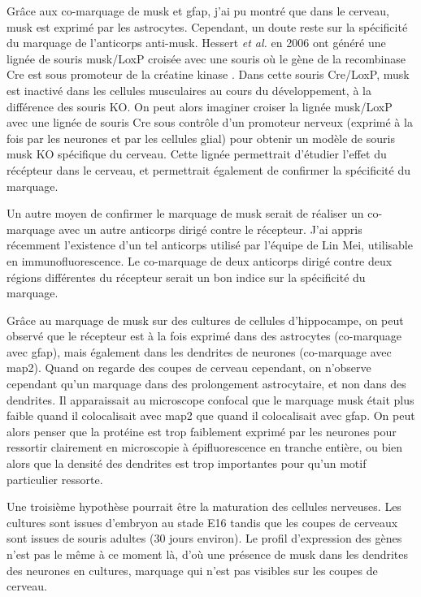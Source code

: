 Grâce aux co-marquage de \gls{musk} et \gls{gfap}, j'ai pu montré que dans le cerveau, \gls{musk} est exprimé par les astrocytes. Cependant,  un doute reste sur la spécificité du marquage de l'anticorps anti-\gls{musk}. Hessert \emph{et al.} en 2006 ont généré une lignée de souris \gls{musk}/LoxP croisée avec une souris où le gène de la recombinase Cre est sous promoteur de la créatine kinase \cite{Hesser2006a}. Dans cette souris Cre/LoxP, \gls{musk} est inactivé dans les cellules musculaires au cours du développement, à la différence des souris KO. On peut alors imaginer croiser la lignée \gls{musk}/LoxP avec une lignée de souris Cre sous contrôle d'un promoteur nerveux (exprimé à la fois par les neurones et par les cellules glial) pour obtenir un modèle de souris \gls{musk} KO spécifique du cerveau. Cette lignée permettrait d'étudier l'effet du récépteur dans le cerveau, et permettrait également de confirmer la spécificité du marquage.

Un autre moyen de confirmer le marquage de \gls{musk} serait de réaliser un co-marquage avec un autre anticorps dirigé contre le récepteur. J'ai appris récemment l'existence d'un tel anticorps utilisé par l'équipe de Lin Mei, utilisable en immunofluorescence. Le co-marquage de deux anticorps dirigé contre deux régions différentes du récepteur serait un bon indice sur la spécificité du marquage. 

Grâce au marquage de \gls{musk} sur des cultures de cellules d'hippocampe, on peut observé que le récepteur est à la fois exprimé dans des astrocytes (co-marquage avec \gls{gfap}), mais également dans les dendrites de neurones (co-marquage avec \gls{map2}). Quand on regarde des coupes de cerveau cependant, on n'observe cependant qu'un marquage dans des prolongement astrocytaire, et non dans des dendrites. Il apparaissait au microscope confocal que le marquage \gls{musk} était plus faible quand il colocalisait avec \gls{map2} que quand il colocalisait avec \gls{gfap}. On peut alors penser que la protéine est trop faiblement exprimé par les neurones pour ressortir clairement en microscopie à épifluorescence en tranche entière, ou bien alors que la densité des dendrites est trop importantes pour qu'un motif particulier ressorte. 

Une troisième hypothèse pourrait être la maturation des  cellules nerveuses. Les cultures sont issues d'embryon au stade E16 tandis que les coupes de cerveaux sont issues de souris adultes (30 jours environ). Le profil d'expression des gènes n'est pas le même à ce moment là, d'où une présence de \gls{musk} dans les dendrites des neurones en cultures, marquage qui n'est pas visibles sur les coupes de cerveau. 

